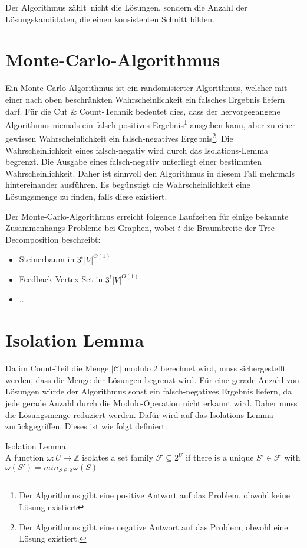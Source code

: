 Der Algorithmus \glqq zählt\grqq ~nicht die Lösungen, sondern die Anzahl der Lösungskandidaten, die einen konsistenten Schnitt bilden.

\section{Monte-Carlo-Algorithmus}
\label{sec:cc_monte}
Ein Monte-Carlo-Algorithmus ist ein randomisierter Algorithmus, welcher mit einer nach oben beschränkten Wahrscheinlichkeit ein falsches Ergebnis liefern darf. 
Für die Cut \& Count-Technik bedeutet dies, dass der hervorgegangene Algorithmus niemals ein falsch-positives Ergebnis\footnote{Der Algorithmus gibt eine positive Antwort auf das Problem, obwohl keine Lösung existiert} ausgeben kann, aber zu einer gewissen Wahrscheinlichkeit ein falsch-negatives Ergebnis\footnote{Der Algorithmus gibt eine negative Antwort auf das Problem, obwohl eine Lösung existiert.}. 
Die Wahrscheinlichkeit eines falsch-negativ wird durch das Isolations-Lemma begrenzt. 
Die Ausgabe eines falsch-negativ unterliegt einer bestimmten Wahrscheinlichkeit. Daher ist sinnvoll den Algorithmus in diesem Fall mehrmals hintereinander ausführen. Es begünstigt die Wahrscheinlichkeit eine Lösungsmenge zu finden, falls diese existiert.

Der Monte-Carlo-Algorithmus erreicht folgende Laufzeiten für einige bekannte Zusammenhangs-Probleme bei Graphen, wobei $t$ die Braumbreite der Tree Decomposition beschreibt:
\begin{itemize}
\item Steinerbaum in $3^t |V|^{O(1)}$
\item Feedback Vertex Set in $3^t|V|^{O(1)}$
\item ...
\end{itemize}

\section{Isolation Lemma}
\label{sec:cc_iso}
Da im Count-Teil die Menge $|\mathcal{C}|$ modulo 2 berechnet wird, muss sichergestellt werden, dass die Menge der Lösungen begrenzt wird. 
Für eine gerade Anzahl von Lösungen würde der Algorithmus sonst ein falsch-negatives Ergebnis liefern, da jede gerade Anzahl durch die Modulo-Operation nicht erkannt wird. 
Daher muss die Lösungsmenge reduziert werden. Dafür wird auf das Isolations-Lemma zurückgegriffen. Dieses ist wie folgt definiert:

\begin{definition}
Isolation Lemma\\
 A function $\omega : U \rightarrow \mathbb{Z}$ isolates a set family $\mathcal{F} \subseteq 2^U$ if there is a unique $S' \in \mathcal{F}$ with $\omega (S')=min_{S \in \mathcal{S}} \omega(S)$\\
\end{definition}

